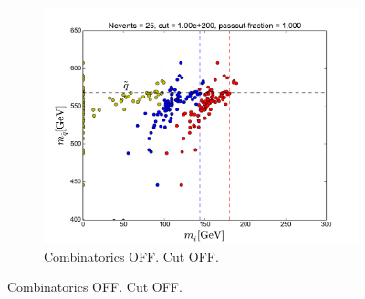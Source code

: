 \documentclass[twoside,english]{uiofysmaster}
\begin{document}
\begin{figure}[hbt]
	\centering
	\begin{subfigure}[b]{0.49\textwidth}
		\includegraphics[width=\textwidth]{figures/making-sense/pythia_combinatorics-OFF_nocut.pdf} 
		\caption{Combinatorics OFF. Cut OFF. }
	\end{subfigure}


\end{figure}
\end{document}
